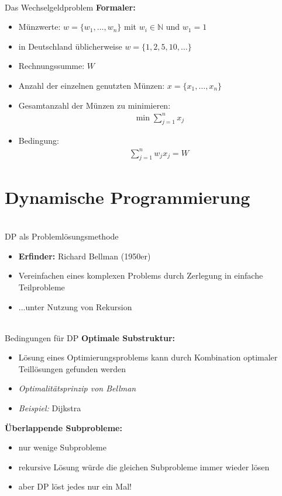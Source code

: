 \documentclass[hyphens,compress,fleqn]{beamer}
\begin{document}
	\begin{frame}{{\footnotesize\insertsectionhead\\}Das Wechselgeldproblem}
		\textbf{Formaler:}
		\begin{itemize}[<+->]
			\item Münzwerte: $w = \{w_1,\dots,w_n\}$ mit $w_i \in \mathbb{N}$ und $w_1 = 1$
			\item in Deutschland üblicherweise $w = \{1,2,5,10,\dots\}$
			\item Rechnungssumme: $W$
			\item Anzahl der einzelnen genutzten Münzen: $x = \{x_1,\dots,x_n\}$
			\item Gesamtanzahl der Münzen zu minimieren:
			\begin{align*}
			\min \sum_{j=1}^{n} x_j
			\end{align*}
			\item Bedingung:
			\begin{align*}
			\sum_{j=1}^{n} w_jx_j = W
			\end{align*}
		\end{itemize}
	\end{frame}

	\section{Dynamische Programmierung}
	\begin{frame}{{\footnotesize\insertsectionhead\\}DP als Problemlösungsmethode}
		\begin{itemize}
			\item \textbf{Erfinder:} Richard Bellman (1950er)
			\item Vereinfachen eines komplexen Problems durch Zerlegung in einfache Teilprobleme
			\item ...unter Nutzung von Rekursion
		\end{itemize}
	\end{frame}

	\begin{frame}{{\footnotesize\insertsectionhead\\}Bedingungen für DP}
		\textbf{Optimale Substruktur:}
		\begin{itemize}[<+->]
			\item Lösung eines Optimierungsproblems kann durch Kombination optimaler Teillösungen gefunden werden
			\item \textit{Optimalitätsprinzip von Bellman}
			\item \textit{Beispiel:} Dijkstra
		\end{itemize}
		\vspace*{0.5cm}
		\textbf{Überlappende Subprobleme:}
		\begin{itemize}[<+->]
			\item nur wenige Subprobleme
			\item rekursive Lösung würde die gleichen Subprobleme immer wieder lösen
			\item aber DP löst jedes nur ein Mal!
		\end{itemize}
	\end{frame}
\end{document}

